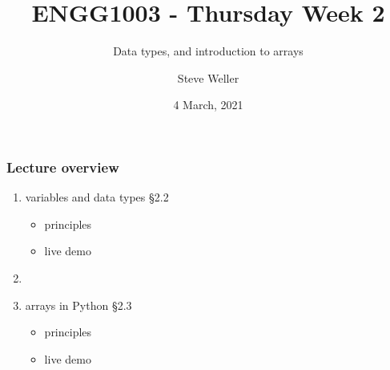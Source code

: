 \documentclass[14pt]{beamer}
\title{ENGG1003 - Thursday Week 2}
\subtitle{Data types, and introduction to arrays}
\author{Steve Weller}
\institute{University of Newcastle}
\date{4 March, 2021}
\newcommand\red[1]{{\color{red} #1}}
\begin{document}
\framebreak


\begin{frame}[fragile]

\frametitle{Lecture overview}
\begin{enumerate}
	\item variables and data types \red{\S2.2}
	\begin{itemize}
		\item principles
		\item live demo
	\end{itemize}

	\item[]
	
	\item arrays in Python \red{\S2.3}
		\begin{itemize}
			\item principles
			\item live demo
		\end{itemize}

\end{enumerate}

\end{frame}

\end{document}
